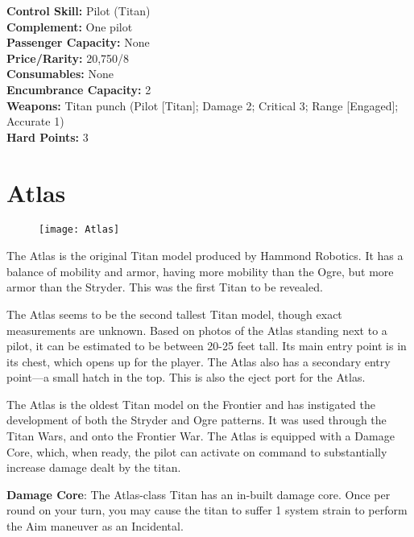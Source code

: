 \vspace{2em}


\begin{multicols}{2}
\noindent\textbf{Control Skill:} Pilot (Titan)\\
\noindent\textbf{Complement:} One pilot\\
\noindent\textbf{Passenger Capacity:} None\\
\noindent\textbf{Price/Rarity:} 20,750/8\\
\noindent\textbf{Consumables:} None\\
\noindent\textbf{Encumbrance Capacity:} 2\\
\noindent\textbf{Weapons:} Titan punch (Pilot [Titan]; Damage 2; Critical 3; Range [Engaged]; Accurate 1)\\
\noindent\textbf{Hard Points:} 3
\end{multicols}

\section{Atlas}
\label{sec:atlas}
\begin{wrapfigure}{l}{.34\linewidth}
\texttt{[image: Atlas]}
\end{wrapfigure}


The Atlas is the original Titan model produced by Hammond Robotics. It has a balance of mobility and armor, having more mobility than the Ogre, but more armor than the Stryder. This was the first Titan to be revealed.

The Atlas seems to be the second tallest Titan model, though exact measurements are unknown. Based on photos of the Atlas standing next to a pilot, it can be estimated to be between 20-25 feet tall. Its main entry point is in its chest, which opens up for the player. The Atlas also has a secondary entry point---a small hatch in the top. This is also the eject port for the Atlas.

The Atlas is the oldest Titan model on the Frontier and has instigated the development of both the Stryder and Ogre patterns. It was used through the Titan Wars, and onto the Frontier War. The Atlas is equipped with a Damage Core, which, when ready, the pilot can activate on command to substantially increase damage dealt by the titan.

\textbf{Damage Core}: The Atlas-class Titan has an in-built damage core. Once per round on your turn, you may cause the titan to suffer 1 system strain to perform the Aim maneuver as an Incidental.\\[1em]

